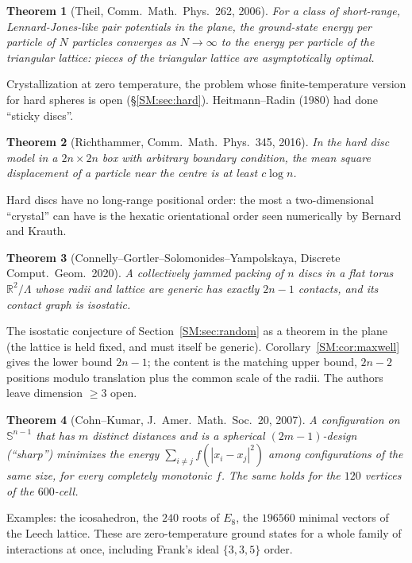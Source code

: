 \documentclass[11pt,openany]{book}
\theoremstyle{plain}
\newtheorem{theorem}{Theorem}[chapter]
\theoremstyle{definition}
\theoremstyle{remark}
\newcommand{\R}{\mathbb{R}}
\newcommand{\Sph}{\mathbb{S}}          %
\newcommand{\abs}[1]{\left\lvert #1 \right\rvert}
\begin{document}
\begin{theorem}[Theil, Comm.\ Math.\ Phys.\ 262, 2006]
For a class of short-range, Lennard-Jones-like pair potentials in the plane, the ground-state energy per
particle of $N$ particles converges as $N\to\infty$ to the energy per particle of the triangular lattice:
pieces of the triangular lattice are asymptotically optimal.
\end{theorem}
\noindent Crystallization at zero temperature, the problem whose finite-temperature version for hard
spheres is open (\S\ref{SM:sec:hard}). Heitmann--Radin (1980) had done ``sticky discs''.

\begin{theorem}[Richthammer, Comm.\ Math.\ Phys.\ 345, 2016]
In the hard disc model in a $2n\times2n$ box with arbitrary boundary condition, the mean square
displacement of a particle near the centre is at least $c\log n$.
\end{theorem}
\noindent Hard discs have no long-range positional order: the most a two-dimensional ``crystal'' can
have is the hexatic orientational order seen numerically by Bernard and Krauth.

\begin{theorem}[Connelly--Gortler--Solomonides--Yampolskaya, Discrete Comput.\ Geom.\ 2020]
A collectively jammed packing of $n$ discs in a flat torus $\R^2/\Lambda$ whose radii and lattice are
generic has exactly $2n-1$ contacts, and its contact graph is isostatic.
\end{theorem}
\noindent The isostatic conjecture of Section~\ref{SM:sec:random} as a theorem in the plane (the lattice is
held fixed, and must itself be generic). Corollary~\ref{SM:cor:maxwell} gives the lower bound $2n-1$; the
content is the matching upper bound, $2n-2$ positions modulo translation plus the common scale of the
radii. The authors leave dimension $\ge3$ open.

\begin{theorem}[Cohn--Kumar, J.~Amer.\ Math.\ Soc.\ 20, 2007]
A configuration on $\Sph^{n-1}$ that has $m$ distinct distances and is a spherical $(2m-1)$-design
(``sharp'') minimizes the energy $\sum_{i\ne j}f(\abs{x_i-x_j}^2)$ among configurations of the same size,
for every completely monotonic $f$. The same holds for the $120$ vertices of the $600$-cell.
\end{theorem}
\noindent Examples: the icosahedron, the $240$ roots of $E_8$, the $196560$ minimal vectors of the Leech
lattice. These are zero-temperature ground states for a whole family of interactions at once, including
Frank's ideal $\{3,3,5\}$ order.
\end{document}
